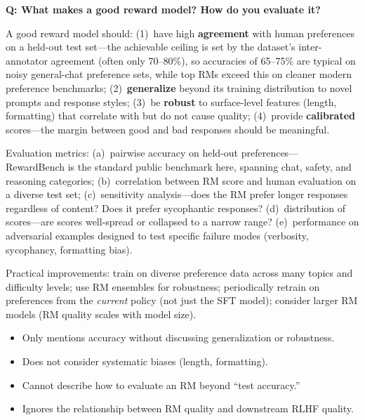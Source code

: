 \begin{interviewq}
\textbf{Q: What makes a good reward model?  How do you evaluate it?}

 \quad {} \quad
\badgefreq{\freqmed}

\stronganswer
A good reward model should: (1)~have high \textbf{agreement} with human
preferences on a held-out test set---the achievable ceiling is set by the
dataset's inter-annotator agreement (often only 70--80\%), so accuracies of
65--75\% are typical on noisy general-chat preference sets, while top RMs
exceed this on cleaner modern preference benchmarks; (2)~\textbf{generalize}
beyond its training distribution to novel prompts and response styles;
(3)~be \textbf{robust} to surface-level features (length, formatting) that
correlate with but do not cause quality; (4)~provide \textbf{calibrated}
scores---the margin between good and bad responses should be meaningful.

Evaluation metrics: (a)~pairwise accuracy on held-out preferences---
RewardBench is the standard public benchmark here, spanning chat, safety,
and reasoning categories;
(b)~correlation between RM score and human evaluation on a diverse test set;
(c)~sensitivity analysis---does the RM prefer longer responses regardless
of content? Does it prefer sycophantic responses?  (d)~distribution of
scores---are scores well-spread or collapsed to a narrow range?
(e)~performance on adversarial examples designed to test specific failure
modes (verbosity, sycophancy, formatting bias).

Practical improvements: train on diverse preference data across many topics
and difficulty levels; use RM ensembles for robustness; periodically retrain
on preferences from the \emph{current} policy (not just the SFT model);
consider larger RM models (RM quality scales with model size).

\redflags
\begin{itemize}
\item Only mentions accuracy without discussing generalization or robustness.
\item Does not consider systematic biases (length, formatting).
\item Cannot describe how to evaluate an RM beyond ``test accuracy.''
\item Ignores the relationship between RM quality and downstream RLHF quality.
\end{itemize}



\end{interviewq}
